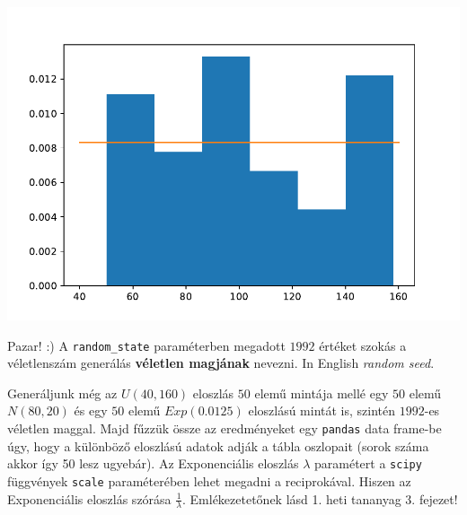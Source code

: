 \documentclass[
]{book}
\begin{document}
\includegraphics{_main_files/figure-latex/unnamed-chunk-210-13.pdf}

Pazar! :) A \texttt{random\_state} paraméterben megadott \(1992\) értéket szokás a véletlenszám generálás \textbf{véletlen magjának} nevezni. In English \emph{random seed}.

Generáljunk még az \(U(40, 160)\) eloszlás \(50\) elemű mintája mellé egy \(50\) elemű \(N(80,20)\) és egy \(50\) elemű \(Exp(0.0125)\) eloszlású mintát is, szintén \(1992\)-es véletlen maggal. Majd fűzzük össze az eredményeket egy \texttt{pandas} data frame-be úgy, hogy a különböző eloszlású adatok adják a tábla oszlopait (sorok száma akkor így 50 lesz ugyebár).
Az Exponenciális eloszlás \(\lambda\) paramétert a \texttt{scipy} függvények \texttt{scale} paraméterében lehet megadni a reciprokával. Hiszen az Exponenciális eloszlás szórása \(\frac{1}{\lambda}\). Emlékezetetőnek lásd 1. heti tananyag 3. fejezet!
\end{document}
